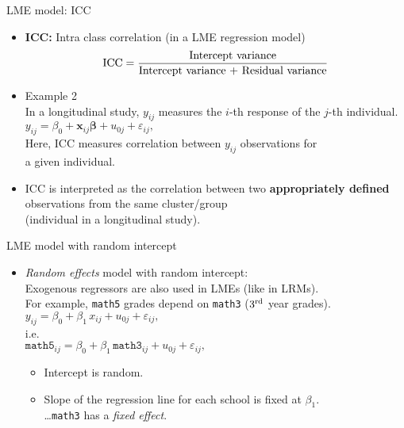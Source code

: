 \documentclass{beamer}
\begin{document}
\begin{frame}{LME model: ICC}
\begin{itemize}
\item \textbf{ICC:} Intra class correlation (in a LME regression model) \qquad
$$ \textnormal{ICC}=\frac{\textnormal{Intercept variance}}{\textnormal{Intercept variance + Residual variance}} $$
\medskip
\item Example 2\\ \medskip
In a longitudinal study, $y_{ij}$ measures the $i$-th response of the $j$-th individual. \\ \medskip
$y_{ij} = \beta_{0} + \bm{x}_{ij} \bm{\beta} + u_{0j} + \varepsilon_{ij},$\\ \medskip
Here, ICC measures correlation between $y_{ij}$  observations for \\a given individual.
\medskip
\item ICC is interpreted as the correlation between two \textbf{appropriately defined} observations from the same cluster/group \\(individual in a longitudinal study). 
\end{itemize}
\end{frame}
\begin{frame}{LME model with random intercept}
\begin{itemize}
\item \textit{Random effects} model with random intercept:\\
\bigskip
Exogenous regressors are also used in LMEs (like in LRMs).\\
\smallskip
For example, \texttt{math5} grades depend on \texttt{math3} ($3{^{\textnormal{rd}}}$ year grades).\\
\medskip
$ y_{ij} = \beta_{0} + \beta_1 \, x_{ij} + u_{0j} + \varepsilon_{ij}, $\\
\medskip
i.e.\\
$ \texttt{math5}_{ij} = \beta_{0} + \beta_1 \, \texttt{math3}_{ij} + u_{0j} + \varepsilon_{ij}, $\\
\medskip
\begin{itemize}
\item Intercept is random.
\smallskip
\item Slope of the regression line for each school is fixed at $\beta_1$.\\
\dots \texttt{math3} has a \textit{fixed effect}.
\end{itemize}
\end{itemize}
\end{frame}
\end{document}

